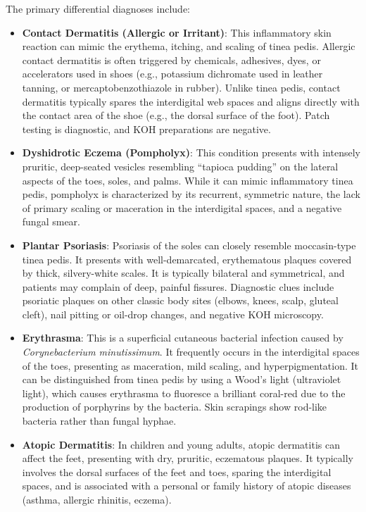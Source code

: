 The primary differential diagnoses include:
\begin{itemize}
    \item \textbf{Contact Dermatitis (Allergic or Irritant)}: This inflammatory skin reaction can mimic the erythema, itching, and scaling of tinea pedis. Allergic contact dermatitis is often triggered by chemicals, adhesives, dyes, or accelerators used in shoes (e.g., potassium dichromate used in leather tanning, or mercaptobenzothiazole in rubber). Unlike tinea pedis, contact dermatitis typically spares the interdigital web spaces and aligns directly with the contact area of the shoe (e.g., the dorsal surface of the foot). Patch testing is diagnostic, and KOH preparations are negative.
    \item \textbf{Dyshidrotic Eczema (Pompholyx)}: This condition presents with intensely pruritic, deep-seated vesicles resembling ``tapioca pudding'' on the lateral aspects of the toes, soles, and palms. While it can mimic inflammatory tinea pedis, pompholyx is characterized by its recurrent, symmetric nature, the lack of primary scaling or maceration in the interdigital spaces, and a negative fungal smear.
    \item \textbf{Plantar Psoriasis}: Psoriasis of the soles can closely resemble moccasin-type tinea pedis. It presents with well-demarcated, erythematous plaques covered by thick, silvery-white scales. It is typically bilateral and symmetrical, and patients may complain of deep, painful fissures. Diagnostic clues include psoriatic plaques on other classic body sites (elbows, knees, scalp, gluteal cleft), nail pitting or oil-drop changes, and negative KOH microscopy.
    \item \textbf{Erythrasma}: This is a superficial cutaneous bacterial infection caused by \textit{Corynebacterium minutissimum}. It frequently occurs in the interdigital spaces of the toes, presenting as maceration, mild scaling, and hyperpigmentation. It can be distinguished from tinea pedis by using a Wood's light (ultraviolet light), which causes erythrasma to fluoresce a brilliant coral-red due to the production of porphyrins by the bacteria. Skin scrapings show rod-like bacteria rather than fungal hyphae.
    \item \textbf{Atopic Dermatitis}: In children and young adults, atopic dermatitis can affect the feet, presenting with dry, pruritic, eczematous plaques. It typically involves the dorsal surfaces of the feet and toes, sparing the interdigital spaces, and is associated with a personal or family history of atopic diseases (asthma, allergic rhinitis, eczema).

\end{itemize}
